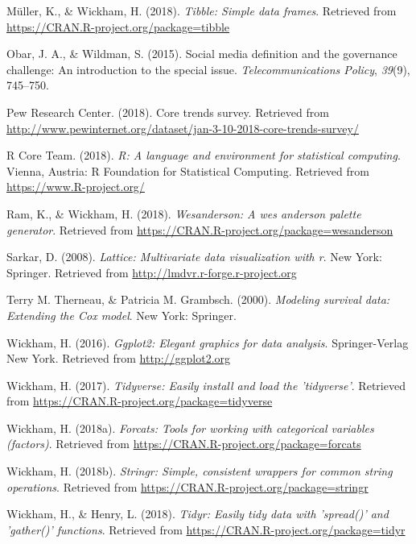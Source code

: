 \documentclass[man, fleqn, noextraspace]{apa6}
\theoremstyle{definition}
\theoremstyle{definition}
\theoremstyle{definition}
\theoremstyle{remark}
\begin{document}
\hypertarget{ref-R-tibble}{}
Müller, K., \& Wickham, H. (2018). \emph{Tibble: Simple data frames}.
Retrieved from \url{https://CRAN.R-project.org/package=tibble}

\hypertarget{ref-Obar2015}{}
Obar, J. A., \& Wildman, S. (2015). Social media definition and the
governance challenge: An introduction to the special issue.
\emph{Telecommunications Policy}, \emph{39}(9), 745--750.

\hypertarget{ref-Pew}{}
Pew Research Center. (2018). Core trends survey. Retrieved from
\url{http://www.pewinternet.org/dataset/jan-3-10-2018-core-trends-survey/}

\hypertarget{ref-R-base}{}
R Core Team. (2018). \emph{R: A language and environment for statistical
computing}. Vienna, Austria: R Foundation for Statistical Computing.
Retrieved from \url{https://www.R-project.org/}

\hypertarget{ref-R-wesanderson}{}
Ram, K., \& Wickham, H. (2018). \emph{Wesanderson: A wes anderson
palette generator}. Retrieved from
\url{https://CRAN.R-project.org/package=wesanderson}

\hypertarget{ref-R-lattice}{}
Sarkar, D. (2008). \emph{Lattice: Multivariate data visualization with
r}. New York: Springer. Retrieved from
\url{http://lmdvr.r-forge.r-project.org}

\hypertarget{ref-R-survival-book}{}
Terry M. Therneau, \& Patricia M. Grambsch. (2000). \emph{Modeling
survival data: Extending the Cox model}. New York: Springer.

\hypertarget{ref-R-ggplot2}{}
Wickham, H. (2016). \emph{Ggplot2: Elegant graphics for data analysis}.
Springer-Verlag New York. Retrieved from \url{http://ggplot2.org}

\hypertarget{ref-R-tidyverse}{}
Wickham, H. (2017). \emph{Tidyverse: Easily install and load the
'tidyverse'}. Retrieved from
\url{https://CRAN.R-project.org/package=tidyverse}

\hypertarget{ref-R-forcats}{}
Wickham, H. (2018a). \emph{Forcats: Tools for working with categorical
variables (factors)}. Retrieved from
\url{https://CRAN.R-project.org/package=forcats}

\hypertarget{ref-R-stringr}{}
Wickham, H. (2018b). \emph{Stringr: Simple, consistent wrappers for
common string operations}. Retrieved from
\url{https://CRAN.R-project.org/package=stringr}

\hypertarget{ref-R-tidyr}{}
Wickham, H., \& Henry, L. (2018). \emph{Tidyr: Easily tidy data with
'spread()' and 'gather()' functions}. Retrieved from
\url{https://CRAN.R-project.org/package=tidyr}
\end{document}
